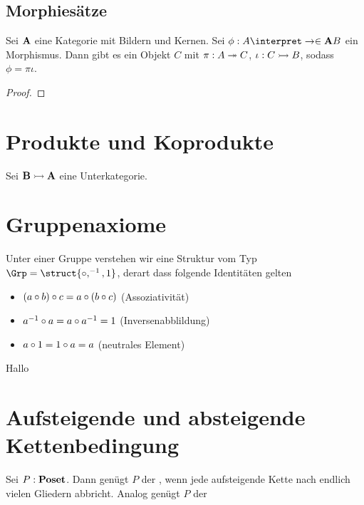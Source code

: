 \subsection{Morphiesätze}

\begin{theorem}
    Sei $\mathbf{A}$ eine Kategorie mit Bildern und Kernen. Sei $\phi:A\interpret\to\in\bfA B$ ein Morphismus. Dann gibt es ein Objekt
    $C$ mit $\pi:A\twoheadrightarrow C$, $\iota:C\rightarrowtail B$, sodass $\phi = \pi\iota$. 
\end{theorem}

\begin{proof}
    
\end{proof}

\section{Produkte und Koprodukte}

Sei $\mathbf{B}\rightarrowtail\mathbf{A}$ eine Unterkategorie. 


\section{Gruppenaxiome}

Unter einer Gruppe verstehen wir eine Struktur vom Typ $\Grp=\struct{\compose,^{-1},1}$, derart dass folgende Identitäten gelten
\begin{itemize}
        \item $(a\circ b)\circ c = a\circ (b\circ c)$ (Assoziativität)
        \item $a^{-1}\circ a = a\circ a^{-1} = 1$ (Inversenabblildung)
    \item $a\circ 1 = 1\circ a = a$ (neutrales Element)
\end{itemize}

\begin{theorem}
    Hallo
\end{theorem}

\section{Aufsteigende und absteigende Kettenbedingung}

\begin{definition}
    Sei $P:\mathbf{Poset}$. Dann genügt $P$ der , wenn jede aufsteigende Kette nach endlich vielen Gliedern
    abbricht. Analog genügt $P$ der  
\end{definition}

